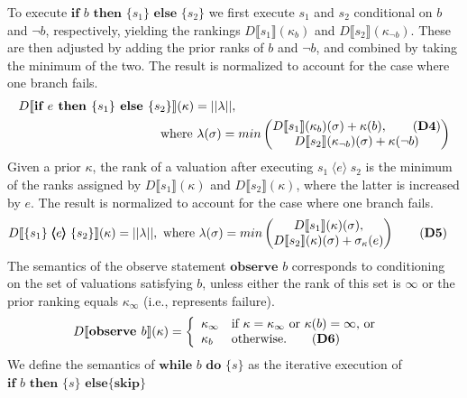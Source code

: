 \documentclass{llncs}
\newcommand{\dn}[1]{D\llbracket #1 \rrbracket}
\newcommand{\Rank}[1]{\hspace{3pt} \pmb{\langle} #1 \pmb{\rangle}\hspace{3pt} } %
\begin{document}
To execute $\textbf{if }b\textbf{ then }\{ s_1 \}\textbf{ else }\{ s_2 \}$ we first 
	execute $s_1$ and $s_2$ conditional on $b$ and $\neg b$, respectively, 
		yielding the rankings $\dn{s_1}(\kappa_{b})$ and $\dn{s_2}(\kappa_{\neg b})$.
	These are then adjusted by adding the prior ranks of $b$ and $\neg b$, and
		combined by taking the minimum of the two.
	The result is normalized to account for the case where one branch fails.
\begin{align*}
\dn{\textbf{if }e\textbf{ then }\{ s_1 \}\textbf{ else }\{ s_2 \}}(\kappa)	& = || \lambda ||,   \\
			&  \hspace{-30pt} \mbox{ where }\lambda(\sigma) = min\begin{pmatrix} \dn{s_1}(\kappa_{b})(\sigma) + \kappa(b), \tag{\textbf{D4}} \\ \dn{s_2}(\kappa_{\neg b})(\sigma) + \kappa(\neg b) \end{pmatrix}  
\end{align*}
	Given a prior $\kappa$, the rank of a valuation after executing $s_1 \Rank{e} s_2$
		is the minimum of the ranks assigned by $\dn{s_1}(\kappa)$ and $\dn{s_2}(\kappa)$,
			where the latter is increased by $e$.
	The result is normalized to account for the case where one branch fails.
\begin{align}
\dn{\{ s_1 \} \Rank{e} \{ s_2 \}}(\kappa)	& = || \lambda ||, \mbox{ where }\lambda(\sigma) = min \begin{pmatrix} \dn{s_1}(\kappa)(\sigma), \\ \dn{s_2}(\kappa)(\sigma) + \sigma_{\kappa}(e) \end{pmatrix} \tag{\textbf{D5}} 
\end{align}
	The semantics of the observe statement $\textbf{observe }b$ corresponds to conditioning on the set of valuations satisfying $b$, unless either the rank of this set is $\infty$ or the prior ranking equals $\kappa_{\infty}$ (i.e., represents failure).
\begin{align}
\dn{\textbf{observe }b}(\kappa)  & = 
		\left\{
			\begin{array}{ll}
				\kappa_{\infty}								& \mbox{if }\kappa = \kappa_\infty\mbox{ or }\kappa(b) = \infty\mbox{, or}\\
				\kappa_{b}								& \mbox{otherwise.}\tag{\textbf{D6}}
			\end{array}
		\right. 
\end{align}
	We define the semantics of $\textbf{while }b\textbf{ do }\{s\}$
		as the iterative execution of $\textbf{if }b\textbf{ then }\{s\}$ $\textbf{else} \{\textbf{skip}\}$
\end{document}
